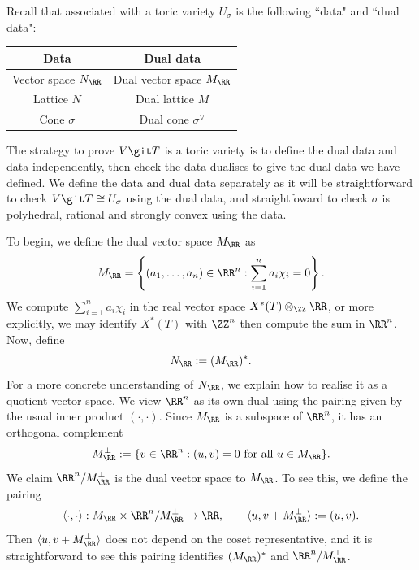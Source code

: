 \documentclass[12pt]{amsart}
\theoremstyle{plain}
\begin{document}
Recall that associated with a toric variety $U_\sigma$ is the following ``data" and ``dual data":
\begin{center}
\begin{tabular}{c | c}
	Data & Dual data \\
	\hline
	Vector space $N_\RR$ & Dual vector space $M_\RR$ \\
	Lattice $N$ & Dual lattice $M$ \\
	Cone $\sigma$ & Dual cone $\sigma^\vee$
\end{tabular}
\end{center}
\noindent
The strategy to prove $V \git T$ is a toric variety is to define the dual data and data independently, then check the data dualises to give the dual data we have defined.
We define the data and dual data separately as it will be straightforward to check $V \git T \cong U_\sigma$ using the dual data, and straightfoward to check $\sigma$ is polyhedral, rational and strongly convex using the data.

To begin, we define the dual vector space $M_\RR$ as
$$M_\RR = \left\{(a_1, \ldots, a_n) \in \RR^n : \sum_{i=1}^n a_i \chi_i = 0 \right\}.$$
We compute $\sum_{i=1}^n a_i \chi_i$ in the real vector space $X^*(T) \otimes_\ZZ \RR$, or more explicitly, we may identify $X^*(T)$ with $\ZZ^n$ then compute the sum in $\RR^n$.
Now, define 
$$N_\RR := (M_\RR)^*.$$
For a more concrete understanding of $N_\RR$, we explain how to realise it as a quotient vector space.
We view $\RR^n$ as its own dual using the pairing given by the usual inner product $(\cdot,\cdot)$.
Since $M_\RR$ is a subspace of $\RR^n$, it has an orthogonal complement
$$M_\RR^\perp := \{v \in \RR^n : (u, v) = 0 \text{ for all }u \in M_\RR\}.$$
We claim $\RR^n / M_\RR^\perp$ is the dual vector space to $M_\RR$.
To see this, we define the pairing
$$\langle \cdot, \cdot \rangle : M_\RR \times \RR^n / M_\RR^\perp \to \RR, \qquad \langle u, v + M_\RR^\perp \rangle := (u, v).$$
Then $\langle u, v + M_\RR^\perp \rangle$ does not depend on the coset representative, and it is straightforward to see this pairing identifies $(M_\RR)^*$ and $\RR^n / M_\RR^\perp$.
\end{document}
